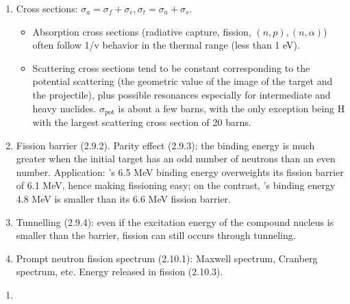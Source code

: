 \documentclass{school-22.211-notes}
\begin{document}
\begin{enumerate}
\begin{table}
    \caption{Main Reactions Undergone By Neutrons} \label{main-reactions}
  \end{table}
\item Cross sections: $\sigma_a = \sigma_f + \sigma_c, \sigma_t = \sigma_a + \sigma_s$. 
  \begin{itemize}
  \item Absorption cross sections (radiative capture, fission, $(n,p), (n,\alpha)$) often follow 1/v behavior in the thermal range (less than 1 eV). 
  \item Scattering cross sections tend to be constant corresponding to the potential scattering (the geometric value of the image of the target and the projectile), plus possible resonances especially for intermediate and heavy nuclides. $\sigma_{\mathrm{pot}}$ is about a few barns, with the only exception being H with the largest scattering cross section of 20 barns. 
  \end{itemize}
\item Fission barrier (2.9.2). Parity effect (2.9.3): the binding energy is much greater when the initial target has an odd number of neutrons than an even number. Application: 's 6.5 MeV binding energy overweights its fission barrier of 6.1 MeV, hence making fissioning easy; on the contrast, 's binding energy 4.8 MeV is smaller than its 6.6 MeV fission barrier. 
\item Tunnelling (2.9.4): even if the excitation energy of the compound nucleus is smaller than the barrier, fission can still occurs through tunneling. 
\item Prompt neutron fission spectrum (2.10.1): Maxwell spectrum, Cranberg spectrum, etc. Energy released in fission (2.10.3). 
\end{enumerate}

\clearpage
\begin{enumerate}
\item 

\end{enumerate}
\end{document}

